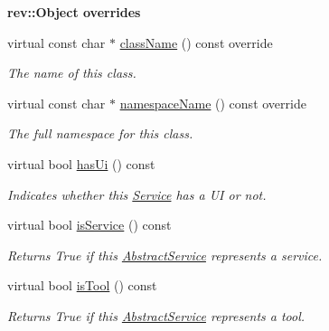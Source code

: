 \begin{Indent}\textbf{ rev\+::Object overrides}\par
\begin{DoxyCompactItemize}
\item 
virtual const char $\ast$ \mbox{\hyperlink{classrev_1_1_view_1_1_g_l_widget_a223f5d2a14ae6e2d3c988d008710e5fc}{class\+Name}} () const override
\begin{DoxyCompactList}\small\item\em The name of this class. \end{DoxyCompactList}\item 
virtual const char $\ast$ \mbox{\hyperlink{classrev_1_1_view_1_1_g_l_widget_aee5ce763da9236cf4b2a707df9f93c3b}{namespace\+Name}} () const override
\begin{DoxyCompactList}\small\item\em The full namespace for this class. \end{DoxyCompactList}\item 
\mbox{\label{classrev_1_1_view_1_1_g_l_widget_afdfb2f0393e995f2f49055139beaa019}} 
virtual bool \mbox{\hyperlink{classrev_1_1_view_1_1_g_l_widget_afdfb2f0393e995f2f49055139beaa019}{has\+Ui}} () const
\begin{DoxyCompactList}\small\item\em Indicates whether this \mbox{\hyperlink{classrev_1_1_service}{Service}} has a UI or not. \end{DoxyCompactList}\item 
virtual bool \mbox{\hyperlink{classrev_1_1_view_1_1_g_l_widget_a5ddbef17b0b7385faed69d79af3799e6}{is\+Service}} () const
\begin{DoxyCompactList}\small\item\em Returns True if this \mbox{\hyperlink{classrev_1_1_abstract_service}{Abstract\+Service}} represents a service. \end{DoxyCompactList}\item 
virtual bool \mbox{\hyperlink{classrev_1_1_view_1_1_g_l_widget_a131ce2b564a067610856a7a080a091ba}{is\+Tool}} () const
\begin{DoxyCompactList}\small\item\em Returns True if this \mbox{\hyperlink{classrev_1_1_abstract_service}{Abstract\+Service}} represents a tool. \end{DoxyCompactList}\end{DoxyCompactItemize}
\end{Indent}
